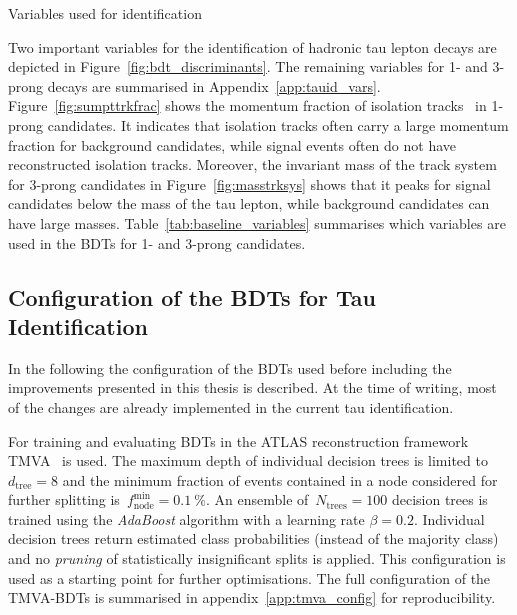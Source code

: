 \begin{table}[htb]
  \centering
  {\def\arraystretch{1.35}\small}
  \caption{Variables used for identification}
  \label{tab:baseline_variables}
\end{table}

Two important variables for the identification of hadronic tau lepton decays are
depicted in Figure~\ref{fig:bdt_discriminants}. The remaining variables for 1-
and 3-prong decays are summarised in Appendix~\ref{app:tauid_vars}.
Figure~\ref{fig:sumpttrkfrac} shows the momentum fraction of isolation
tracks~ in 1-prong candidates. It indicates
that isolation tracks often carry a large momentum fraction for background
candidates, while signal events often do not have reconstructed isolation
tracks. Moreover, the invariant mass of the track system for 3-prong candidates
in Figure~\ref{fig:masstrksys} shows that it peaks for signal candidates below
the mass of the tau lepton, while background candidates can have large masses.
Table~\ref{tab:baseline_variables} summarises which variables are used in the
BDTs for 1- and 3-prong candidates.

\subsection{Configuration of the BDTs for Tau Identification}
In the following the configuration of the BDTs used before including the
improvements presented in this thesis is described. At the time of writing, most
of the changes are already implemented in the current tau identification.

For training and evaluating BDTs in the ATLAS reconstruction framework
TMVA~\cite{tmva} is used. The maximum depth of individual decision trees is
limited to~$d_\text{tree} = 8$ and the minimum fraction of events contained in a
node considered for further splitting
is~$f_\text{node}^\text{min} = \SI{0.1}{\percent}$. An ensemble
of~$N_\text{trees} = 100$ decision trees is trained using the \emph{AdaBoost}
algorithm with a learning rate $\beta = 0.2$. Individual decision trees return
estimated class probabilities (instead of the majority class) and no
\emph{pruning} of statistically insignificant splits is applied. This
configuration is used as a starting point for further optimisations. The full
configuration of the TMVA-BDTs is summarised in appendix~\ref{app:tmva_config}
for reproducibility.


